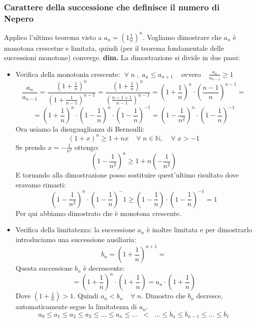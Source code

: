 \subsubsection*{Carattere della successione che definisce il numero di Nepero}
Applico l'ultimo teorema visto a $a_n = (1 \frac{1}{n})^n$.
\newline
Vogliamo dimostrare che $a_n$ è monotona crescetne e limitata, quindi (per il teorema fondamentale delle successioni monotone) converge.
\newline
\textbf{dim.} La dimostrazione si divide in due passi:
\begin{itemize}
    \item Verifica della monotonia crescente:\newline
        $\;\forall\;n \;,\; a_n \leq a_{n+1} \;\;\;$ ovvero $ \;\;\; \frac{a_n}{a_{n-1}} \geq 1$
        \[
            \frac{a_n}{a_{n-1}} = \frac{(1 + \frac{1}{n})^n}{(1 + \frac{1}{n-1})^{n-1}} = \frac{(1+\frac{1}{n})^n}{(\frac{n-1+1}{n-1})^{n-1}} = (1+ \frac{1}{n})^n \cdot (\frac{n-1}{n})^{n-1} = 
        \]       
        \[
            = (1+ \frac{1}{n})^n \cdot (1-\frac{1}{n})^n \cdot (1 - \frac{1}{n})^{-1} = (1- \frac{1}{n^2})^n \cdot (1 -\frac{1}{n})^{-1}
        \]
        Ora usiamo la disuguaglianza di Bernoulli:
        \[
            (1+x)^n \geq 1 + nx \;\;\; \;\forall\;n \in \mathbb{N}, \;\;\;\;\forall\;x > -1
        \]
        Se prendo $x = -\frac{1}{n^2}$ ottengo:
        \[
            (1- \frac{1}{n^2})^n \geq 1 + n(-\frac{1}{n^2})
        \]
        E tornando alla dimostrazione posso sostituire quest'ultimo risultato dove eravamo rimasti:
        \[
            (1- \frac{1}{n^2})^n \cdot (1 -\frac{1}{n})^-1 \geq(1-\frac{1}{n}) \cdot (1-\frac{1}{n})^{-1} = 1
        \]
        Per qui abbiamo dimostrato che è monotona crescente.
    \item Verifica della limitatezza:\newline
        la successione $a_n$ è inoltre limitata e per dimostrarlo introduciamo una successione ausiliaria:
        \[
            b_n = (1 + \frac{1}{n})^{n+1} = 
        \]
        Questa successione $b_n$ è decrescente:
        \[
            = (1 + \frac{1}{n})^{n} \cdot  (1 + \frac{1}{n}) = a_n \cdot (1 + \frac{1}{n})
        \]
        Dove $(1 + \frac{1}{n}) > 1$. \newline
        Quindi $a_n < b_n \;\;\;\;\forall\; n$.
        Dimostro che $b_n$ decresce, automaticamente segue la limitatezza di $a_n$.
        \[
            a_0\leq a_1 \leq a_2 \leq a_3 \leq \dots \leq a_n \leq \dots \;\; <  \;\; \dots \leq b_n \leq b_{n-1} \leq \dots \leq b_1
\]
\end{itemize}
